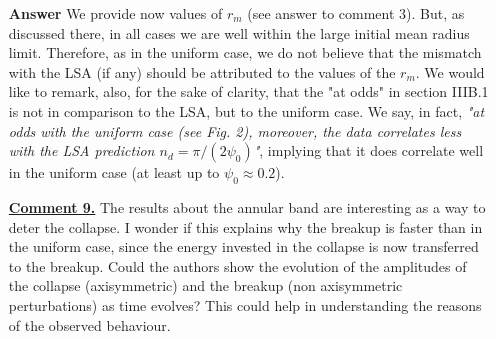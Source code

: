 \documentclass[12pt,english]{article}
\begin{document}
\begin{itemize}
\item[ \textbf{{Answer}}]
{
We provide now values of $r_m$ (see answer to comment 3). But, as discussed 
there, in all cases we are well within the large initial mean radius limit. 
Therefore, as in the uniform case, we do not believe that the mismatch with the LSA
(if any) should be attributed to the values of the $r_m$.
We would like to remark, also, for the sake of clarity, that the "at odds" in 
section IIIB.1 is not in comparison to the LSA, but to the uniform case.
We say, in fact, {\it "at odds with the uniform case (see Fig. 2), moreover, the data correlates less with the LSA prediction $n_d = \pi/(2\psi_0)$"}, implying that it does correlate well in the uniform case (at least up to $\psi_0 \approx 0.2$).
}

\item[ \textbf{\underline{Comment 9.}}]
{
The results about the annular band are interesting as a way to deter the collapse. 
I wonder if this explains why the breakup is faster than in the uniform case, since the energy invested in the collapse is now transferred to the breakup. 
Could the authors show the evolution of the amplitudes of the collapse (axisymmetric) and the breakup (non axisymmetric perturbations) as time evolves? 
This could help in understanding the reasons of the observed behaviour. 
}


\end{itemize}
\end{document}
